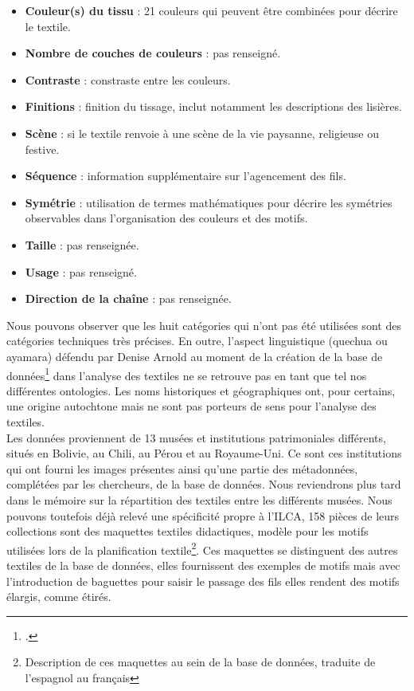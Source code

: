 \begin{citer}
\begin{itemize}
\begin{itemize}
			\end{itemize}
		\item \textbf{Couleur(s) du tissu} : 21 couleurs qui peuvent être combinées pour décrire le textile.
		\item  \textbf{Nombre de couches de couleurs} : pas renseigné.
		\item  \textbf{Contraste} : constraste entre les couleurs.
		\item  \textbf{Finitions} : finition du tissage, inclut notamment les descriptions des lisières.
		\item  \textbf{Scène} : si le textile renvoie à une scène de la vie paysanne, religieuse ou festive.
		\item  \textbf{Séquence} : information supplémentaire sur l'agencement des fils.
		\item  \textbf{Symétrie} : utilisation de termes mathématiques pour décrire les symétries observables dans l'organisation des couleurs et des motifs.
		\item  \textbf{Taille} : pas renseignée.
		\item  \textbf{Usage} : pas renseigné.
		\item  \textbf{Direction de la chaîne} : pas renseignée.
	\end{itemize}
\end{citer}

Nous pouvons observer que les huit catégories qui n'ont pas été utilisées sont des catégories techniques très précises. En outre, l'aspect linguistique (quechua ou ayamara) défendu par Denise Arnold au moment de la création de la base de données\footcite[p.~2]{brownlowOntologicalApproachCreating2015} dans l'analyse des textiles ne se retrouve pas en tant que tel nos différentes ontologies. Les noms historiques et géographiques ont, pour certains, une origine autochtone mais ne sont pas porteurs de sens pour l'analyse des textiles.\\

Les données proviennent de 13 musées et institutions patrimoniales différents, situés en Bolivie, au Chili, au Pérou et au Royaume-Uni. Ce sont ces institutions qui ont fourni les images présentes ainsi qu'une partie des métadonnées, complétées par les chercheurs, de la base de données. Nous reviendrons plus tard dans le mémoire sur la répartition des textiles entre les différents musées. Nous pouvons toutefois déjà relevé une spécificité propre à l'ILCA, 158 pièces de leurs collections sont des \og maquettes textiles didactiques, modèle pour les motifs utilisées lors de la planification textile\fg\footnote{Description de ces maquettes au sein de la base de données, traduite de l'espagnol au français}. Ces maquettes se distinguent des autres textiles de la base de données, elles fournissent des exemples de motifs mais avec l'introduction de baguettes pour saisir le passage des fils elles rendent des motifs élargis, comme étirés.

